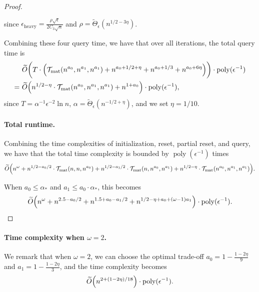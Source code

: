 \documentclass[11pt]{article}
\newcommand{\Tmat}{\mathcal{T}_{\mathrm{mat}}}
\let\originalleft\left
\let\originalright\right
\renewcommand{\left}{\mathopen{}\mathclose\bgroup\originalleft}
\renewcommand{\right}{\aftergroup\egroup\originalright}
\newcommand{\wt}{\widetilde}
\DeclareMathOperator*{\poly}{{\mathrm{poly}}}
\newcommand{\heavy}{\text{heavy}}
\begin{document}
\begin{proof}
\begin{itemize}
since $\epsilon_{\heavy} = \frac{\rho \sqrt{\epsilon}}{2 C_3 \sqrt{n}}$ and $\rho = \widetilde{\Theta}_{\epsilon}(n^{1/2-3\eta})$.
\end{itemize}
Combining these four query time, we have that over all iterations, the total query time is
\begin{align*}
&~ \wt{O}\left(T \cdot \Big(\Tmat(n^{a_0}, n^{a_1}, n^{a_1}) + n^{a_0 + 1/2 + \eta} + n^{a_0 + 1/3} + n^{a_0 + 6 \eta} \Big) \right) \cdot \poly(\epsilon^{-1}) \\
= &~ \wt{O}\left(n^{1/2-\eta} \cdot \Tmat(n^{a_0}, n^{a_1}, n^{a_1}) + n^{1 + a_0} \right) \cdot \poly(\epsilon^{-1}),
\end{align*}
since $T = \alpha^{-1}\epsilon^{-2}\ln n$, $\alpha = \widetilde{\Theta}_{\epsilon}(n^{-1/2+\eta})$, and we set $\eta = 1/10$.

\paragraph{Total runtime.} Combining the time complexities of initialization, reset, partial reset, and query, we have that the total time complexity is bounded by $\poly(\epsilon^{-1})$ times
\begin{align*}
\wt{O}\left(n^{\omega} + n^{1/2-a_0/2} \cdot \Tmat(n,n,n^{a_0}) + n^{1/2-a_1/2} \cdot \Tmat(n,n^{a_0},n^{a_1}) + n^{1/2-\eta} \cdot \Tmat(n^{a_0}, n^{a_1}, n^{a_1}) \right).
\end{align*}

When $a_0 \leq \alpha_*$ and $a_1 \leq a_0 \cdot \alpha_*$, this becomes
\begin{align*}
\wt{O}\left(n^{\omega} + n^{2.5-a_0/2} + n^{1.5+a_0-a_1/2} + n^{1/2-\eta + a_0 + (\omega-1) a_1} \right) \cdot \poly(\epsilon^{-1}).
\end{align*}
\end{proof}




\paragraph{Time complexity when $\omega = 2$.}
We remark that when $\omega = 2$, we can choose the optimal trade-off $a_0 = 1 - \frac{1 - 2 \eta}{9}$ and $a_1 = 1 - \frac{1 - 2 \eta}{3}$, and the time complexity becomes
\begin{align*}
\wt{O}\left(n^{2 + (1 - 2\eta) / 18} \right) \cdot \poly(\epsilon^{-1}).
\end{align*}
\end{document}
